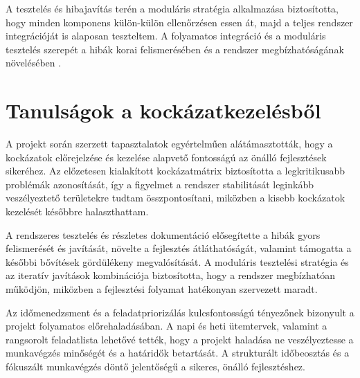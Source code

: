 A tesztelés és hibajavítás terén a moduláris stratégia alkalmazása biztosította, 
hogy minden komponens külön-külön ellenőrzésen essen át, majd a teljes rendszer integrációját is alaposan teszteltem. 
A folyamatos integráció és a moduláris tesztelés szerepét 
a hibák korai felismerésében és a rendszer megbízhatóságának növelésében \cite{Szalay2018,Kaposi2019}. 

\section{Tanulságok a kockázatkezelésből}

A projekt során szerzett tapasztalatok egyértelműen alátámasztották, hogy a kockázatok előrejelzése 
és kezelése alapvető fontosságú az önálló fejlesztések sikeréhez.  
Az előzetesen kialakított kockázatmátrix biztosította a legkritikusabb problémák azonosítását, 
így a figyelmet a rendszer stabilitását leginkább veszélyeztető területekre tudtam összpontosítani, 
miközben a kisebb kockázatok kezelését későbbre halaszthattam.  

A rendszeres tesztelés és részletes dokumentáció elősegítette a hibák gyors felismerését és 
javítását, növelte a fejlesztés átláthatóságát, valamint támogatta a későbbi bővítések gördülékeny megvalósítását.  
A moduláris tesztelési stratégia és az iteratív javítások kombinációja biztosította, hogy a 
rendszer megbízhatóan működjön, miközben a fejlesztési folyamat hatékonyan szervezett maradt.

Az időmenedzsment és a feladatpriorizálás kulcsfontosságú tényezőnek bizonyult a projekt folyamatos előrehaladásában.  
A napi és heti ütemtervek, valamint a rangsorolt feladatlista lehetővé tették, hogy a projekt 
haladása ne veszélyeztesse a munkavégzés minőségét és a határidők betartását.  
A strukturált időbeosztás és a fókuszált munkavégzés döntő jelentőségű a sikeres, önálló fejlesztéshez.
